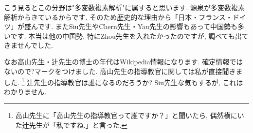 こう見るとこの分野は"多変数複素解析"に属すると思います. 源泉が多変数複素解析からきているからです.
そのため歴史的な理由から「日本・フランス・ドイツ」が盛んです. 
またSiu先生やChern先生・Yau先生の影響もあって中国勢も多いです. 
本当は他の中国勢, 特にZhou先生を入れたかったのですが, 調べても出てきませんでした.  


なお高山先生・辻先生の博士の年代はWikipedia情報になります. 
確定情報ではないので?マークをつけました. 高山先生の指導教官に関しては私が直接聞きました. \footnote{高山先生に「高山先生の指導教官って誰ですか？」と聞いたら, 偶然横にいた辻先生が「私ですね.」と言った.} 辻先生の指導教官は誰になるのだろうか? Siu先生な気もするが, これはわかりません. 

\newpage

